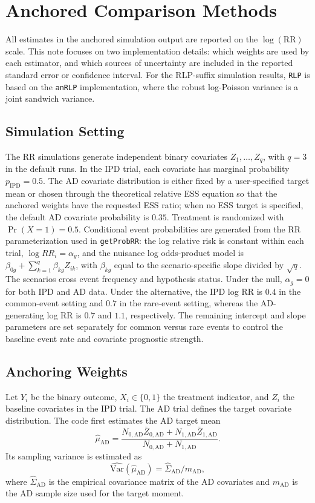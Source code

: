 \documentclass[11pt,a4paper]{article}
\begin{document}
\section{Anchored Comparison Methods}

All estimates in the anchored simulation output are reported on the
\(\log(\mathrm{RR})\) scale.  This note focuses on two implementation details:
which weights are used by each estimator, and which sources of uncertainty are
included in the reported standard error or confidence interval.  For the
RLP-suffix simulation results, \texttt{RLP} is based on the
\texttt{anRLP} implementation, where the robust log-Poisson variance is a joint
sandwich variance.

\subsection{Simulation Setting}

The RR simulations generate independent binary covariates
\(Z_1,\ldots,Z_q\), with \(q=3\) in the default runs.  In the IPD trial, each
covariate has marginal probability \(p_{\mathrm{IPD}}=0.5\).  The AD covariate
distribution is either fixed by a user-specified target mean or chosen through
the theoretical relative ESS equation so that the anchored weights have the
requested ESS ratio; when no ESS target is specified, the default AD covariate
probability is \(0.35\).  Treatment is randomized with \(\Pr(X=1)=0.5\).
Conditional event probabilities are generated from the RR parameterization used
in \texttt{getProbRR}: the log relative risk is constant within each trial,
\(\log RR_i=\alpha_g\), and the nuisance log odds-product model is
\(\beta_{0g}+\sum_{k=1}^q\beta_{kg}Z_{ik}\), with \(\beta_{kg}\) equal to the
scenario-specific slope divided by \(\sqrt q\).  The scenarios cross event
frequency and hypothesis status.  Under the null, \(\alpha_g=0\) for both IPD
and AD data.  Under the alternative, the IPD log RR is \(0.4\) in the
common-event setting and \(0.7\) in the rare-event setting, whereas the
AD-generating log RR is \(0.7\) and \(1.1\), respectively.  The remaining
intercept and slope parameters are set separately for common versus rare events
to control the baseline event rate and covariate prognostic strength.

\subsection{Anchoring Weights}

Let \(Y_i\) be the binary outcome, \(X_i\in\{0,1\}\) the treatment indicator,
and \(Z_i\) the baseline covariates in the IPD trial.  The AD trial defines the
target covariate distribution.  The code first estimates the AD target mean
\[
  \widehat\mu_{\mathrm{AD}}
  =
  \frac{N_{0,\mathrm{AD}}\bar Z_{0,\mathrm{AD}}
        +N_{1,\mathrm{AD}}\bar Z_{1,\mathrm{AD}}}
       {N_{0,\mathrm{AD}}+N_{1,\mathrm{AD}}}.
\]
Its sampling variance is estimated as
\[
  \widehat{\mathrm{Var}}(\widehat\mu_{\mathrm{AD}})
  =
  \widehat\Sigma_{\mathrm{AD}}/m_{\mathrm{AD}},
\]
where \(\widehat\Sigma_{\mathrm{AD}}\) is the empirical covariance matrix of the
AD covariates and \(m_{\mathrm{AD}}\) is the AD sample size used for the target
moment.
\end{document}

